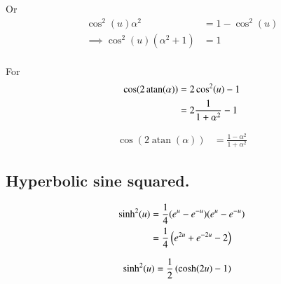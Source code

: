 \documentclass{article}
\DeclareMathOperator{\atan}{atan}
\begin{document}
Or
\begin{align*}
\cos^2(u) \alpha^2 &= 1 - \cos^2(u) \\
\implies
\cos^2(u) (\alpha^2 +1 ) &= 1 \\
\end{align*}

For 
\begin{align*}
\cos(2\atan(\alpha)) 
&= 
2 \cos^2( u ) -1 \\
&= 
2 \inv{1 + \alpha^2} -1 \\
\end{align*}

\begin{align}\label{eqn:cosineTwiceArcTan}
\cos(2\atan(\alpha)) 
&= 
\frac{1 - \alpha^2}{1 + \alpha^2}
\end{align}

\subsection{ Hyperbolic sine squared. }

\begin{align*}
\sinh^2(u) 
&=
\frac{1}{4} (e^u - e^{-u}) (e^u - e^{-u}) \\
&=
\frac{1}{4} \left(e^{2u} + e^{-2u} -2 \right) \\
\end{align*}

\begin{align}\label{eqn:sinhSquared}
\sinh^2(u) 
&=
\frac{1}{2} \left( \cosh(2u) -1 \right) 
\end{align}



\end{document}
